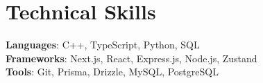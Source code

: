 \documentclass[letterpaper,11pt]{article}
\begin{document}
%
\section{Technical Skills}
 \begin{itemize}[leftmargin=0.15in, label={}]
    \small{\item{
     \textbf{Languages}{: C++, TypeScript, Python, SQL} \\
     \textbf{Frameworks}{: Next.js, React, Express.js, Node.js, Zustand} \\
     \textbf{Tools}{: Git, Prisma, Drizzle, MySQL, PostgreSQL} \\
    }}
 \end{itemize}


\end{document}
